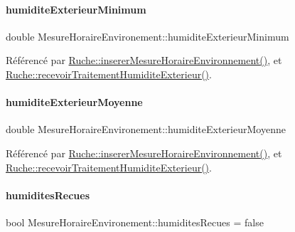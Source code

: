 \paragraph{\texorpdfstring{humidite\+Exterieur\+Minimum}{humiditeExterieurMinimum}}
{\footnotesize\ttfamily double Mesure\+Horaire\+Environement\+::humidite\+Exterieur\+Minimum}



Référencé par \hyperlink{class_ruche_ac52e79446c5629645e02e27d2a01e56c}{Ruche\+::inserer\+Mesure\+Horaire\+Environnement()}, et \hyperlink{class_ruche_a59e89246b484d7b63851c0ebd20af6c5}{Ruche\+::recevoir\+Traitement\+Humidite\+Exterieur()}.

\mbox{\label{struct_mesure_horaire_environement_a25909e0885ee3588c637b738ced303d7}} 
\paragraph{\texorpdfstring{humidite\+Exterieur\+Moyenne}{humiditeExterieurMoyenne}}
{\footnotesize\ttfamily double Mesure\+Horaire\+Environement\+::humidite\+Exterieur\+Moyenne}



Référencé par \hyperlink{class_ruche_ac52e79446c5629645e02e27d2a01e56c}{Ruche\+::inserer\+Mesure\+Horaire\+Environnement()}, et \hyperlink{class_ruche_a59e89246b484d7b63851c0ebd20af6c5}{Ruche\+::recevoir\+Traitement\+Humidite\+Exterieur()}.

\mbox{\label{struct_mesure_horaire_environement_a4348771984d70b9ea7867dba511db336}} 
\paragraph{\texorpdfstring{humidites\+Recues}{humiditesRecues}}
{\footnotesize\ttfamily bool Mesure\+Horaire\+Environement\+::humidites\+Recues = false}



